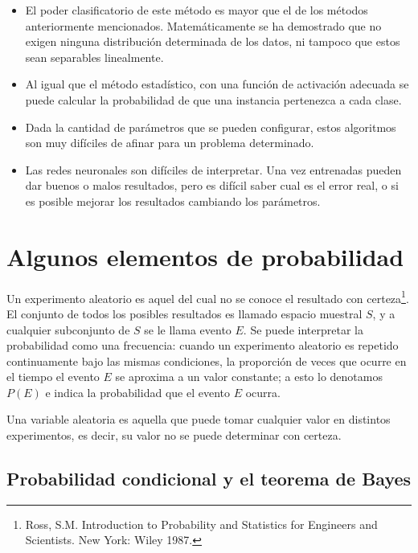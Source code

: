 \documentclass[a4paper, 11pt, oneside]{report}
\begin{document}
\begin{itemize}

	\item El poder clasificatorio de este método es mayor que el de los métodos anteriormente mencionados. Matemáticamente se ha demostrado que no exigen ninguna distribución determinada de los datos, ni tampoco que estos sean separables linealmente.

	\item Al igual que el método estadístico, con una función de activación adecuada se puede calcular la probabilidad de que una instancia pertenezca a cada clase.

	\item Dada la cantidad de parámetros que se pueden configurar, estos algoritmos son muy difíciles de afinar para un problema determinado.

	\item Las redes neuronales son difíciles de interpretar. Una vez entrenadas pueden dar buenos o malos resultados, pero es difícil saber cual es el error real, o si es posible mejorar los resultados cambiando los parámetros.

\end{itemize}

\section{Algunos elementos de probabilidad}

Un experimento aleatorio es aquel del cual no se conoce el resultado con certeza\footnote{Ross, S.M. Introduction to Probability and Statistics for Engineers and Scientists. New York: Wiley 1987.}. El conjunto de todos los posibles resultados es llamado espacio muestral $S$, y a cualquier subconjunto de $S$ se le llama evento $E$. Se puede interpretar la probabilidad como una frecuencia: cuando un experimento aleatorio es repetido continuamente bajo las mismas condiciones, la proporción de veces que ocurre en el tiempo el evento $E$ se aproxima a un valor constante; a esto lo denotamos $P(E)$ e indica la probabilidad que el evento $E$ ocurra.

Una variable aleatoria es aquella que puede tomar cualquier valor en distintos experimentos, es decir, su valor no se puede determinar con certeza.

\subsection{Probabilidad condicional y el teorema de Bayes}
\end{document}
